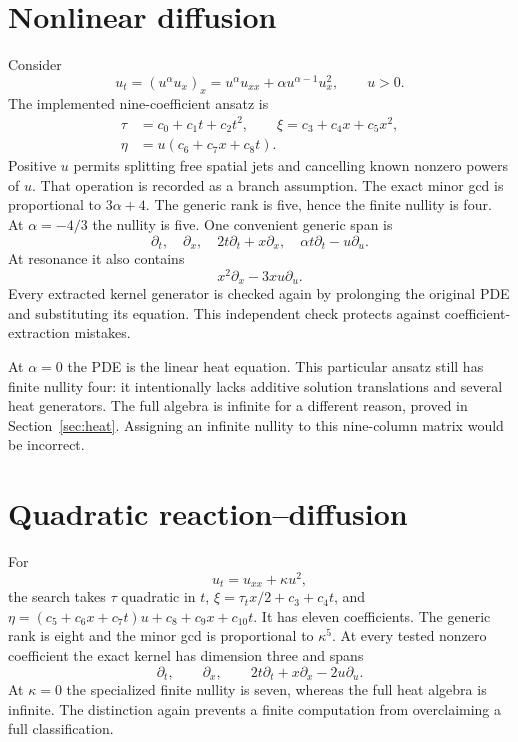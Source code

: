 \documentclass[12pt,a4paper,oneside]{report}
\numberwithin{equation}{chapter}
\begin{document}
\section{Nonlinear diffusion}
Consider
\begin{equation}\label{eq:diffusion}
u_t=(u^\alpha u_x)_x=u^\alpha u_{xx}+\alpha u^{\alpha-1}u_x^2,
\qquad u>0.
\end{equation}
The implemented nine-coefficient ansatz is
\begin{align}
\tau&=c_0+c_1t+c_2t^2,\qquad
\xi=c_3+c_4x+c_5x^2,\\
\eta&=u(c_6+c_7x+c_8t).
\end{align}
Positive $u$ permits splitting free spatial jets and cancelling known nonzero
powers of $u$. That operation is recorded as a branch assumption. The exact
minor gcd is proportional to $3\alpha+4$. The generic rank is five, hence the
finite nullity is four. At $\alpha=-4/3$ the nullity is five.
One convenient generic span is
\begin{equation}
\partial_t,\quad\partial_x,\quad2t\partial_t+x\partial_x,
\quad\alpha t\partial_t-u\partial_u.
\end{equation}
At resonance it also contains
\begin{equation}
x^2\partial_x-3xu\partial_u.
\end{equation}
Every extracted kernel generator is checked again by prolonging the original
PDE and substituting its equation. This independent check protects against
coefficient-extraction mistakes.

At $\alpha=0$ the PDE is the linear heat equation. This particular ansatz
still has finite nullity four: it intentionally lacks additive solution
translations and several heat generators. The full algebra is infinite for
a different reason, proved in Section~\ref{sec:heat}. Assigning an infinite
nullity to this nine-column matrix would be incorrect.

\section{Quadratic reaction--diffusion}
For
\begin{equation}\label{eq:reaction}
u_t=u_{xx}+\kappa u^2,
\end{equation}
the search takes $\tau$ quadratic in $t$,
$\xi=\tau_t x/2+c_3+c_4t$, and
$\eta=(c_5+c_6x+c_7t)u+c_8+c_9x+c_{10}t$.
It has eleven coefficients. The generic rank is eight and the minor gcd is
proportional to $\kappa^5$. At every tested nonzero coefficient the exact
kernel has dimension three and spans
\begin{equation}
\partial_t,\qquad\partial_x,\qquad
2t\partial_t+x\partial_x-2u\partial_u.
\end{equation}
At $\kappa=0$ the specialized finite nullity is seven, whereas the full heat
algebra is infinite. The distinction again prevents a finite computation
from overclaiming a full classification.
\end{document}
